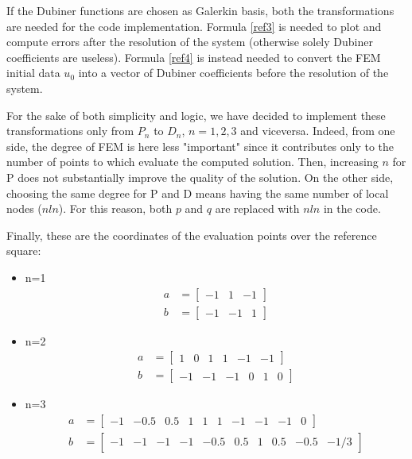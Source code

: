 \documentclass[a4paper]{article}
\begin{document}
	\vspace{5mm}
	\noindent If the Dubiner functions are chosen as Galerkin basis, both the transformations are needed for the code implementation. Formula \ref{ref3} is needed to plot and compute errors after the resolution of the system (otherwise solely Dubiner coefficients are useless). Formula \ref{ref4} is instead needed to convert the FEM initial data $u_0$ into a vector of Dubiner coefficients before the resolution of the system.
	
	\vspace{5mm}
	\noindent For the sake of both simplicity and logic, we have decided to implement these transformations only from $P_n$ to $D_n$, $n=1,2,3$ and viceversa. Indeed, from one side, the degree of FEM is here less "important" since it contributes only to the number of points to which evaluate the computed solution. Then, increasing $n$ for P does not substantially improve the quality of the solution. On the other side, choosing the same degree for P and D means having the same number of local nodes ($nln$). For this reason, both $p$ and $q$ are replaced with $nln$ in the code.	
	
	
	\vspace{5mm}
	\noindent Finally, these are the coordinates of the evaluation points over the reference square:
	\begin{itemize}
	\item n=1
	\begin{equation*}
	\begin{split}
	a &= \begin{bmatrix} -1 & 1& -1\end{bmatrix}\\ b &= \begin{bmatrix} -1 &-1& 1\end{bmatrix}
	\end{split}
	\end{equation*} 
	
	\item n=2
	\begin{equation*}
	\begin{split}
	a &= \begin{bmatrix} 1 &0& 1 &1 &-1& -1\end{bmatrix} \\ b &= \begin{bmatrix}-1& -1& -1& 0& 1& 0\end{bmatrix}
	\end{split}
	\end{equation*} 
	
	\item n=3
	\begin{equation*}
	\begin{split}
	a &= \begin{bmatrix}-1& -0.5& 0.5& 1& 1& 1& -1& -1& -1& 0\end{bmatrix} \\ b&=\begin{bmatrix}-1& -1& -1& -1& -0.5& 0.5& 1& 0.5& -0.5& -1/3\end{bmatrix}
	\end{split}
	\end{equation*}
	\end{itemize}
\end{document}
